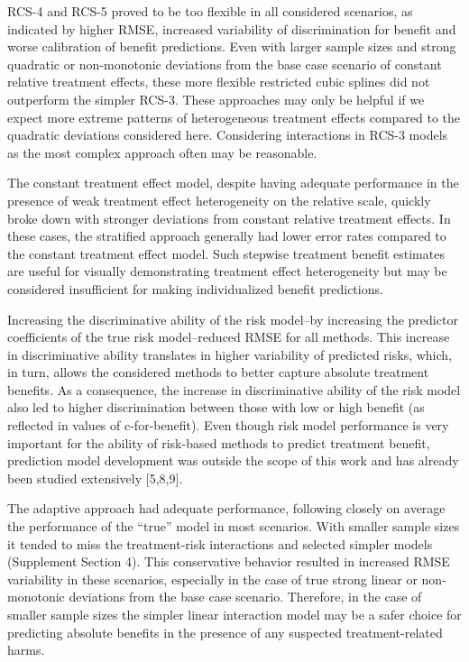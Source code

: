 \documentclass[]{elsarticle} %
\begin{document}
RCS-4 and RCS-5 proved to be too flexible in all considered scenarios,
as indicated by higher RMSE, increased variability of discrimination for
benefit and worse calibration of benefit predictions. Even with larger
sample sizes and strong quadratic or non-monotonic deviations from the
base case scenario of constant relative treatment effects, these more
flexible restricted cubic splines did not outperform the simpler RCS-3.
These approaches may only be helpful if we expect more extreme patterns
of heterogeneous treatment effects compared to the quadratic deviations
considered here. Considering interactions in RCS-3 models as the most
complex approach often may be reasonable.

The constant treatment effect model, despite having adequate performance
in the presence of weak treatment effect heterogeneity on the relative
scale, quickly broke down with stronger deviations from constant
relative treatment effects. In these cases, the stratified approach
generally had lower error rates compared to the constant treatment
effect model. Such stepwise treatment benefit estimates are useful for
visually demonstrating treatment effect heterogeneity but may be
considered insufficient for making individualized benefit predictions.

Increasing the discriminative ability of the risk model--by increasing
the predictor coefficients of the true risk model--reduced RMSE for all
methods. This increase in discriminative ability translates in higher
variability of predicted risks, which, in turn, allows the considered
methods to better capture absolute treatment benefits. As a consequence,
the increase in discriminative ability of the risk model also led to
higher discrimination between those with low or high benefit (as
reflected in values of c-for-benefit). Even though risk model
performance is very important for the ability of risk-based methods to
predict treatment benefit, prediction model development was outside the
scope of this work and has already been studied extensively {[}5,8,9{]}.

The adaptive approach had adequate performance, following closely on
average the performance of the ``true'' model in most scenarios. With
smaller sample sizes it tended to miss the treatment-risk interactions
and selected simpler models (Supplement Section 4). This conservative
behavior resulted in increased RMSE variability in these scenarios,
especially in the case of true strong linear or non-monotonic deviations
from the base case scenario. Therefore, in the case of smaller sample
sizes the simpler linear interaction model may be a safer choice for
predicting absolute benefits in the presence of any suspected
treatment-related harms.
\end{document}
